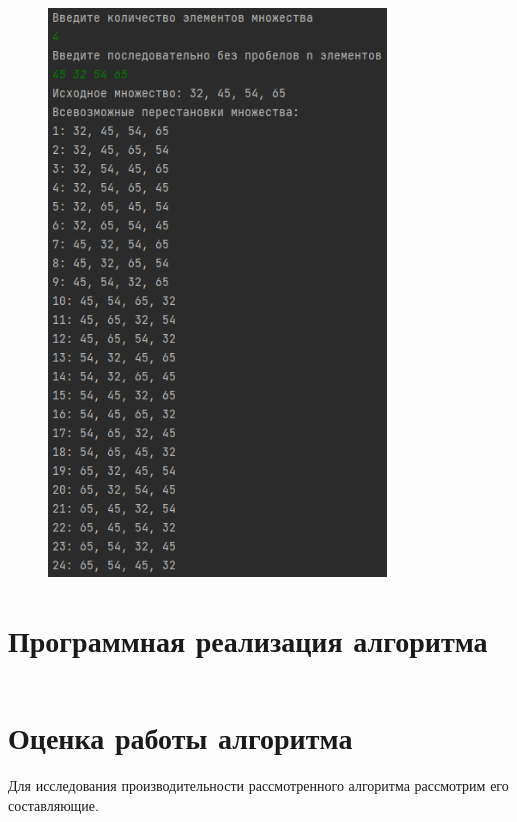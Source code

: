 \documentclass[bachelor, och, labwork]{shiza}
\begin{document}
        \begin{figure}[H]
            \centering
            \includegraphics[width=0.8\textwidth]{1.png}
            \caption{}
        \end{figure}

\section{Программная реализация алгоритма}

\inputminted[linenos,breaklines=true, fontsize=\small, style=bw]{python}{1.py}

\section{Оценка работы алгоритма}

Для исследования производительности рассмотренного алгоритма рассмотрим его
составляющие.
\end{document}
